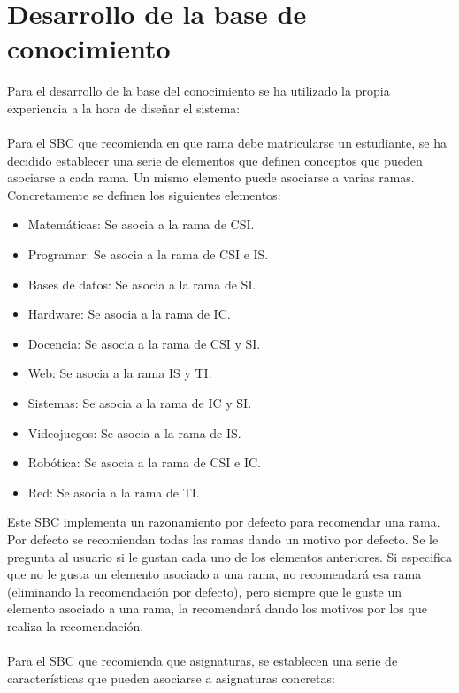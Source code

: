 \section{Desarrollo de la base de conocimiento}
Para el desarrollo de la base del conocimiento se ha utilizado la propia experiencia a la hora de diseñar el sistema:\\
\\
Para el SBC que recomienda en que rama debe matricularse un estudiante, se ha decidido establecer una serie de elementos que definen conceptos que pueden asociarse a cada rama. Un mismo elemento puede asociarse a varias ramas. Concretamente se definen los siguientes elementos:
\begin{itemize}
   \item Matemáticas: Se asocia a la rama de CSI.
   \item Programar: Se asocia a la rama de CSI e IS.
   \item Bases de datos: Se asocia a la rama de SI.
   \item Hardware: Se asocia a la rama de IC.
   \item Docencia: Se asocia a la rama de CSI y SI.
   \item Web: Se asocia a la rama IS y TI.
   \item Sistemas: Se asocia a la rama de IC y SI.
   \item Videojuegos: Se asocia a la rama de IS.
   \item Robótica: Se asocia a la rama de CSI e IC.
   \item Red: Se asocia a la rama de TI.
\end{itemize}
Este SBC implementa un razonamiento por defecto para recomendar una rama. Por defecto se recomiendan todas las ramas dando un motivo por defecto. Se le pregunta al usuario si le gustan cada uno de los elementos anteriores. Si especifica que no le gusta un elemento asociado a una rama, no recomendará esa rama (eliminando la recomendación por defecto), pero siempre que le guste un elemento asociado a una rama, la recomendará dando los motivos por los que realiza la recomendación.\\
\\
Para el SBC que recomienda que asignaturas, se establecen una serie de características que pueden asociarse a asignaturas concretas:

